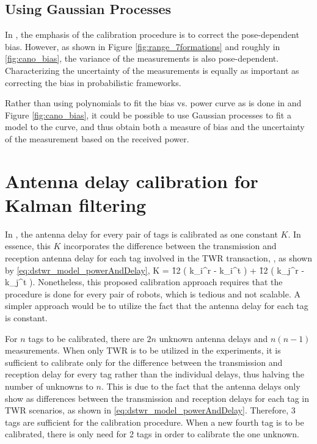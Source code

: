 \documentclass{decar-wsd}    %
\begin{document}
\subsection{Using Gaussian Processes}

In \cite{Cano2022}, the emphasis of the calibration procedure is to correct the pose-dependent bias. However, as shown in Figure \ref{fig:range_7formations} and roughly in \ref{fig:cano_bias}, the variance of the measurements is also pose-dependent. Characterizing the uncertainty of the measurements is equally as important as correcting the bias in probabilistic frameworks.

Rather than using polynomials to fit the bias vs. power curve as is done in \cite{Cano2022} and Figure \ref{fig:cano_bias}, it could be possible to use Gaussian processes to fit a model to the curve, and thus obtain both a measure of bias and the uncertainty of the measurement based on the received power.

\clearpage
\section{Antenna delay calibration for Kalman filtering}

In \cite{Cano2022}, the antenna delay for every pair of tags is calibrated as one constant $K$. In essence, this $K$ incorporates the difference between the transmission and reception antenna delay for each tag involved in the TWR transaction, \ie, as shown by \eqref{eq:dstwr_model_powerAndDelay},
\beq
    K = \f{1}{2} \left( k_i^r - k_i^t \right) + \f{1}{2} \left( k_j^r - k_j^t \right).
\eeq
Nonetheless, this proposed calibration approach requires that the procedure is done for every pair of robots, which is tedious and not scalable. A simpler approach would be to utilize the fact that the antenna delay for each tag is constant. 

For $n$ tags to be calibrated, there are $2n$ unknown antenna delays and $n(n-1)$ measurements. When only TWR is to be utilized in the experiments, it is sufficient to calibrate only for the difference between the transmission and reception delay for every tag rather than the individual delays, thus halving the number of unknowns to $n$. This is due to the fact that the antenna delays only show as differences between the transmission and reception delays for each tag in TWR scenarios, as shown in \eqref{eq:dstwr_model_powerAndDelay}. Therefore, 3 tags are sufficient for the calibration procedure. When a new fourth tag is to be calibrated, there is only need for 2 tags in order to calibrate the one unknown.
\end{document}
